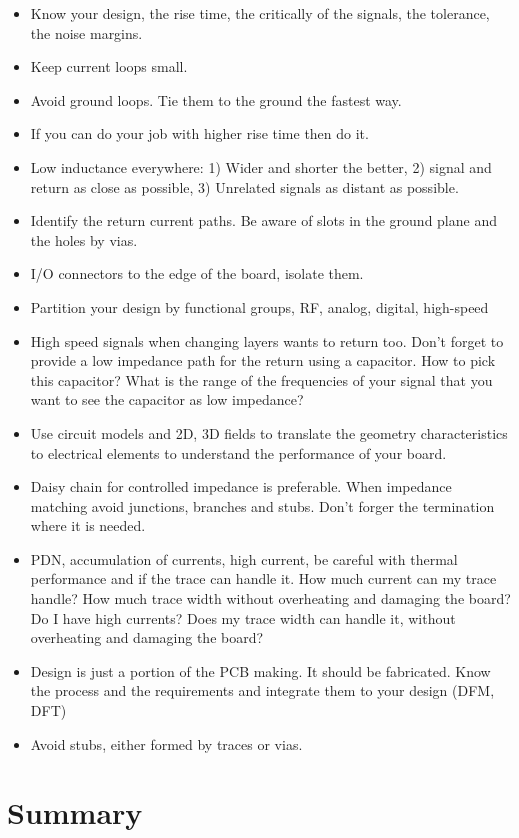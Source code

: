 \documentclass[12pt]{article}
\begin{document}
\begin{itemize}
	\item Know your design, the rise time, the critically of the signals, the tolerance, the noise margins.
	\item Keep current loops small.
	\item Avoid ground loops. Tie them to the ground the fastest way.
	\item If you can do your job with higher rise time then do it.
	\item Low inductance everywhere: 1) Wider and shorter the better, 2) signal and return as close as possible, 3) Unrelated signals as distant as possible.
	\item Identify the return current paths. Be aware of slots in the ground plane and the holes by vias.
	\item I/O connectors to the edge of the board, isolate them.
	\item Partition your design by functional groups, RF, analog, digital, high-speed
	\item High speed signals when changing layers wants to return too. Don't forget to provide a low impedance path for the return using a capacitor. How to pick this capacitor? What is the range of the frequencies of your signal that you want to see the capacitor as low impedance? 
	\item Use circuit models and 2D, 3D fields to translate the geometry characteristics to electrical elements to understand the performance of your board.
	\item Daisy chain for controlled impedance is preferable. When impedance matching avoid junctions, branches and stubs. Don't forger the termination where it is needed.
	\item PDN, accumulation of currents, high current, be careful with thermal performance and if the trace can handle it. How much current can my trace handle? How much trace width without overheating and damaging the board? Do I have high currents? Does my trace width can handle it, without overheating and damaging the board?
	\item Design is just a portion of the PCB making. It should be fabricated. Know the process and the requirements and integrate them to your design (DFM, DFT)
	\item Avoid stubs, either formed by traces or vias.
\end{itemize}

\section{Summary}
\end{document}
